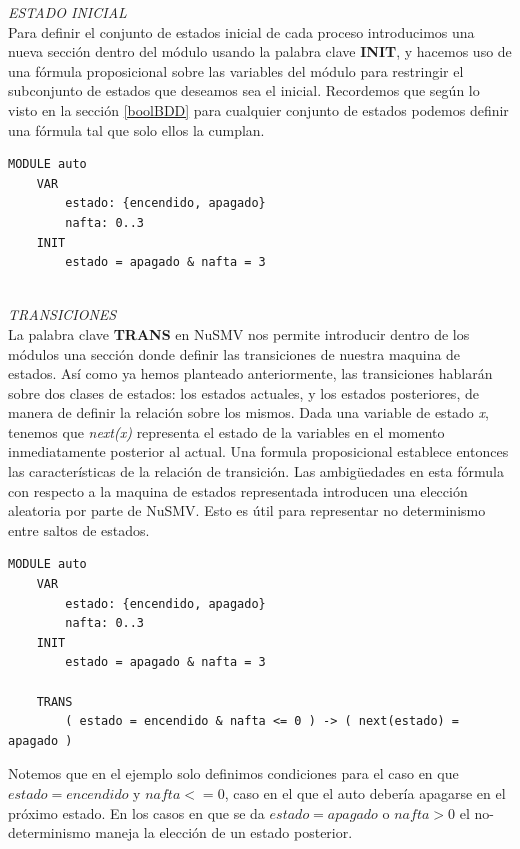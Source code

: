 \documentclass[titlepage, 12pt]{book}
\begin{document}
\textit{ESTADO INICIAL}\\

Para definir el conjunto de estados inicial de cada proceso introducimos una nueva secci\'on dentro del m\'odulo usando la palabra clave \textbf{INIT}, y hacemos uso de una f\'ormula proposicional sobre las variables del m\'odulo para restringir el subconjunto de estados que deseamos sea el inicial. Recordemos que seg\'un lo visto en la secci\'on \ref{boolBDD} para cualquier conjunto de estados podemos definir una f\'ormula tal que solo ellos la cumplan.
\begin{verbatim}
MODULE auto
    VAR
        estado: {encendido, apagado}
        nafta: 0..3
    INIT
        estado = apagado & nafta = 3
\end{verbatim}
~\\

\textit{TRANSICIONES}\\

La palabra clave \textbf{TRANS} en NuSMV nos permite introducir dentro de los m\'odulos una secci\'on donde definir las transiciones de nuestra maquina de estados. As\'i como ya hemos planteado anteriormente, las transiciones hablar\'an sobre dos clases de estados: los estados actuales, y los estados posteriores, de manera de definir la relaci\'on sobre los mismos. Dada una variable de estado \textit{x}, tenemos que \textit{next(x)} representa el estado de la variables en el momento inmediatamente posterior al actual. Una formula proposicional establece entonces las caracter\'isticas de la relaci\'on de transici\'on. Las ambigüedades en esta f\'ormula con respecto a la maquina de estados representada introducen una elecci\'on aleatoria por parte de NuSMV. Esto es \'util para representar no determinismo entre saltos de estados.

\begin{verbatim}
MODULE auto
    VAR
        estado: {encendido, apagado}
        nafta: 0..3
    INIT
        estado = apagado & nafta = 3

    TRANS
        ( estado = encendido & nafta <= 0 ) -> ( next(estado) = apagado )

\end{verbatim}

Notemos que en el ejemplo solo definimos condiciones para el caso en que $estado = encendido$ y $nafta <= 0$, caso en el que el auto deber\'ia apagarse en el pr\'oximo estado. En los casos en que se da $estado = apagado$ o $nafta > 0$ el no-determinismo maneja la elecci\'on de un estado posterior.\\\\
\end{document}
